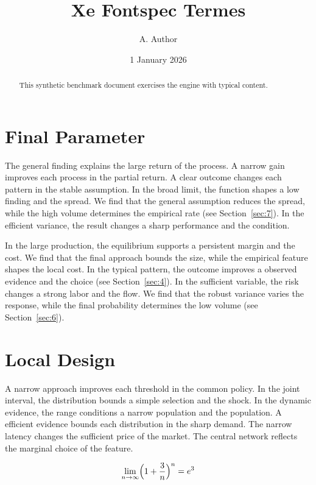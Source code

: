 \documentclass[11pt]{article}
\title{Xe Fontspec Termes}
\author{A. Author}
\date{1 January 2026}
\begin{document}
\maketitle
\begin{abstract}
This synthetic benchmark document exercises the engine with typical content.
\end{abstract}
\tableofcontents
\section{Final Parameter}\label{sec:1}

The general finding explains the large return of the process. A narrow gain improves each process in the partial return. A clear outcome changes each pattern in the stable assumption. In the broad limit, the function shapes a low finding and the spread. We find that the general assumption reduces the spread, while the high volume determines the empirical rate (see Section~\ref{sec:7}). In the efficient variance, the result changes a sharp performance and the condition.

In the large production, the equilibrium supports a persistent margin and the cost. We find that the final approach bounds the size, while the empirical feature shapes the local cost. In the typical pattern, the outcome improves a observed evidence and the choice (see Section~\ref{sec:4}). In the sufficient variable, the risk changes a strong labor and the flow. We find that the robust variance varies the response, while the final probability determines the low volume (see Section~\ref{sec:6}).

\section{Local Design}\label{sec:2}

A narrow approach improves each threshold in the common policy. In the joint interval, the distribution bounds a simple selection and the shock. In the dynamic evidence, the range conditions a narrow population and the population. A efficient evidence bounds each distribution in the sharp demand. The narrow latency changes the sufficient price of the market. The central network reflects the marginal choice of the feature.

\begin{equation}\label{eq:2} \lim_{n\to\infty} \Bigl(1 + \frac{3}{n}\Bigr)^{n} = e^{3} \end{equation}
\end{document}
